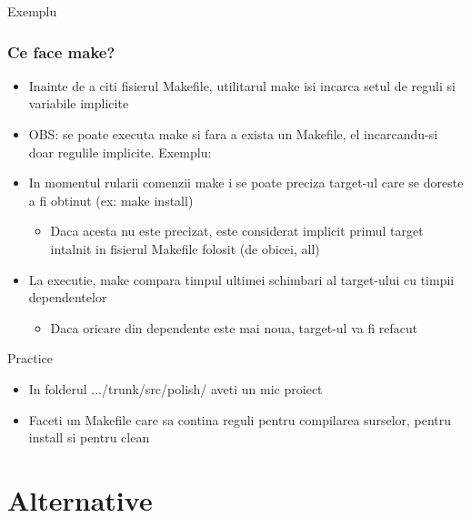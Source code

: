\documentclass{beamer}
\begin{document}
    \begin{frame}{Exemplu}
    
    \end{frame}

    \begin{frame}[allowframebreaks]
    \frametitle{Ce face make?}
    \begin{itemize}
    \setlength{\itemsep}{0.6cm}
    \item Inainte de a citi fisierul Makefile, utilitarul make isi incarca setul de reguli si variabile implicite
    \item OBS: se poate executa make si fara a exista un Makefile, el incarcandu-si doar regulile implicite. Exemplu:\\ \vspace{0.4cm}
    \item In momentul rularii comenzii make i se poate preciza target-ul care se doreste a fi obtinut (ex: make install)\begin{itemize}\item \vspace{0.6cm}Daca acesta nu este precizat, este considerat implicit primul target intalnit in fisierul Makefile folosit (de obicei, {\ttfamily all}) \end{itemize}
    \item La executie, make compara timpul ultimei schimbari al target-ului cu timpii dependentelor \begin{itemize}\item \vspace{0.6cm}Daca oricare din dependente este mai noua, target-ul va fi refacut \end{itemize}
    \end{itemize}
    \end{frame}

    \begin{frame}{Practice}
    \begin{itemize}
    \setlength{\itemsep}{1cm}
    \item In folderul .../trunk/src/polish/ aveti un mic proiect
    \item Faceti un Makefile care sa contina reguli pentru compilarea surselor, pentru install si pentru clean
    \end{itemize}
    \end{frame}

\section{Alternative}
    \frame{\tableofcontents[currentsection]}
\end{document}
